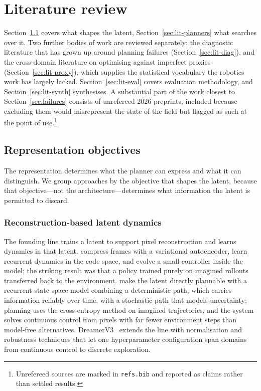 \documentclass[11pt,letterpaper]{article}
\begin{document}
\section{Literature review}\label{sec:lit}

Section~\ref{sec:lit-repr} covers what shapes the latent,
Section~\ref{sec:lit-planners} what searches over it. Two further bodies of work
are reviewed separately: the diagnostic literature that has grown up around
planning failures (Section~\ref{sec:lit-diag}), and the cross-domain literature
on optimising against imperfect proxies (Section~\ref{sec:lit-proxy}), which
supplies the statistical vocabulary the robotics work has largely lacked.
Section~\ref{sec:lit-eval} covers evaluation methodology, and
Section~\ref{sec:lit-synth} synthesises. A substantial part of the work
closest to Section~\ref{sec:failures} consists of unrefereed 2026 preprints,
included because excluding them would misrepresent the state of the field but
flagged as such at the point of use.\footnote{Unrefereed sources are marked in
\texttt{refs.bib} and reported as claims rather than settled results.}

\subsection{Representation objectives}\label{sec:lit-repr}

The representation determines what the planner can express and what it can
distinguish. We group approaches by the objective that shapes the latent,
because that objective---not the architecture---determines what information the
latent is permitted to discard.

\subsubsection{Reconstruction-based latent dynamics}

The founding line trains a latent to support pixel reconstruction and learns
dynamics in that latent. \citet{ha2018worldmodels} compress frames with a
variational autoencoder, learn recurrent dynamics in the code space, and evolve
a small controller inside the model; the striking result was that a policy
trained purely on imagined rollouts transferred back to the environment.
\citet{hafner2019planet} make the latent directly plannable with a recurrent
state-space model combining a deterministic path, which carries information
reliably over time, with a stochastic path that models uncertainty; planning
uses the cross-entropy method on imagined trajectories, and the system solves
continuous control from pixels with far fewer environment steps than model-free
alternatives. DreamerV3~\citep{hafner2025dreamerv3} extends the line with
normalisation and robustness techniques that let one hyperparameter
configuration span domains from continuous control to discrete exploration.
\end{document}
